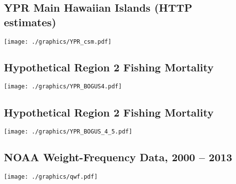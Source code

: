 \documentclass[a4paper,KOMA,landscape,titlepage]{powersem}
\begin{document}
\begin{slide}\section{YPR Main Hawaiian Islands (HTTP estimates)}
\begin{center}
\texttt{[image: ./graphics/YPR\_csm.pdf]}
\end{center}
\end{slide}

\begin{slide}\section{Hypothetical Region 2 Fishing Mortality}
\begin{center}
\texttt{[image: ./graphics/YPR\_BOGUS4.pdf]}
\end{center}
\end{slide}

\begin{slide}\section{Hypothetical Region 2 Fishing Mortality}
\begin{center}
\texttt{[image: ./graphics/YPR\_BOGUS\_4\_5.pdf]}
\end{center}
\end{slide}

\begin{slide}\section{NOAA Weight-Frequency Data, 2000 -- 2013}
\begin{center}
\texttt{[image: ./graphics/qwf.pdf]}
\end{center}
\end{slide}
\end{document}
